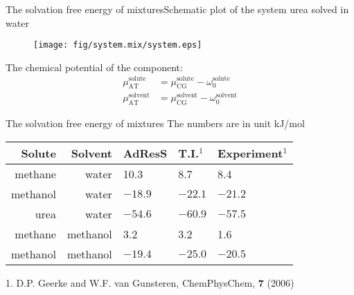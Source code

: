 \documentclass[]{beamer}
\newcommand{\bluec}[1]{{\color{blue} #1}}
\newcommand{\AT}{{\textrm{{AT}}}}
\newcommand{\CG}{{\textrm{CG}}}
\begin{document}
\begin{frame}{The solvation free energy of mixtures}{Schematic plot of the system urea solved in water}
  \begin{figure}
    \centering
    \texttt{[image: fig/system.mix/system.eps]}
  \end{figure}
  The chemical potential of the component:
  \bluec{
    \begin{align*}
      \mu^{\textrm{solute}}_\AT &= \mu^{\textrm{solute}}_\CG - \omega^{\textrm{solute}}_0\\
      \mu^{\textrm{solvent}}_\AT &= \mu^{\textrm{solvent}}_\CG - \omega^{\textrm{solvent}}_0
    \end{align*}
  }
\end{frame}


\begin{frame}{The solvation free energy of mixtures}
  {The numbers are in unit kJ/mol}
  \vfill
  \begin{table}
    \centering
    \begin{tabular}{rr  R{2cm} R{2cm} R{2cm}}
      Solute & Solvent & AdResS &
      T.I.$^1$ &
      Experiment$^1$  \\
      \hline
      methane & water  & 10.3 & 8.7 & 8.4 \\
      methanol & water  & $-18.9$ & $-22.1$ & $-21.2$ \\
      urea &water  & $-54.6$ & $-60.9$ & $-57.5$ \\
      methane & methanol & 3.2 & 3.2 & 1.6 \\
      methanol & methanol & $-19.4$ & $-25.0$ & $-20.5$  
    \end{tabular}
  \end{table}
  \vfill
  \footnotesize{1. D.P. Geerke and W.F. van Gunsteren, ChemPhysChem, \textbf{7} (2006)}
\end{frame}
\end{document}
